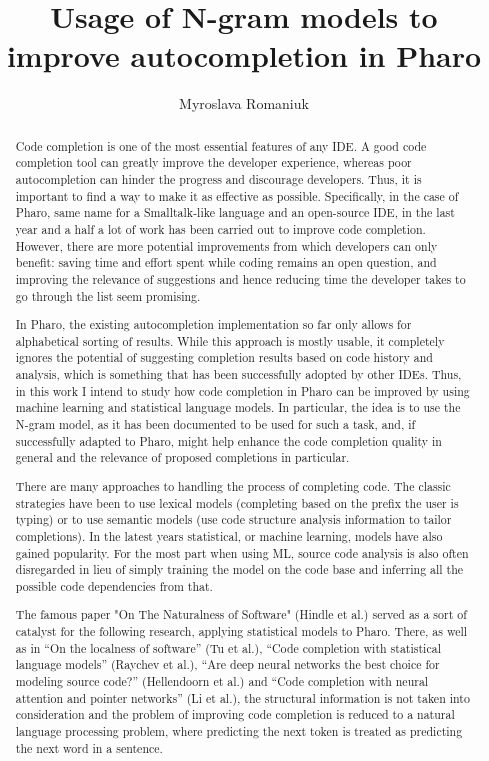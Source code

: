 \documentclass[format=sigconf]{acmart}
\title{Usage of N-gram models to improve autocompletion in Pharo}
\author{Myroslava Romaniuk}
\affiliation{\institution{Ukrainian Catholic University}}
\begin{document}
\begin{abstract}
  \par
  Code completion is one of the most essential features of any IDE.
  A good code completion tool can greatly improve the developer experience,
  whereas poor autocompletion can hinder the progress and discourage
  developers. Thus, it is important to find a way to make it as effective
  as possible. Specifically, in the case of Pharo, same name for a Smalltalk-like
  language and an open-source IDE, in the last year and a half a lot of work
  has been carried out to improve code completion. However, there are more
  potential improvements from which developers can only benefit: saving time
  and effort spent while coding remains an open question, and improving the
  relevance of suggestions and hence reducing time the developer takes to go
  through the list seem promising.

  In Pharo, the existing autocompletion implementation so far only allows for
  alphabetical sorting of results. While this approach is mostly usable, it
  completely ignores the potential of suggesting completion results based
  on code history and analysis, which is something that has been successfully
  adopted by other IDEs. Thus, in this work I intend to study how code
  completion in Pharo can be improved by using machine learning and statistical
  language models. In particular, the idea is to use the N-gram model, as it
  has been documented to be used for such a task, and, if successfully adapted
  to Pharo, might help enhance the code completion quality in general and the
  relevance of proposed completions in particular.

  There are many approaches to handling the process of completing code. The classic
  strategies have been to use lexical models (completing based on the prefix the user
  is typing) or to use semantic models (use code structure analysis information to
  tailor completions). In the latest years statistical, or machine learning, models
  have also gained popularity. For the most part when using ML, source code analysis
  is also often disregarded in lieu of simply training the model on the code base and
  inferring all the possible code dependencies from that.

  The famous paper "On The Naturalness of Software" (Hindle et al.) served as a sort
  of catalyst for the following research, applying statistical models to Pharo.
  There, as well as in “On the localness of software” (Tu et al.), “Code completion
  with statistical language models” (Raychev et al.), “Are deep neural networks the
  best choice for modeling source code?” (Hellendoorn et al.) and “Code completion
  with neural attention and pointer networks” (Li et al.), the structural information
  is not taken into consideration and the problem of improving code completion is
  reduced to a natural language processing problem, where predicting the next token
  is treated as predicting the next word in a sentence.


\end{abstract}
\end{document}
